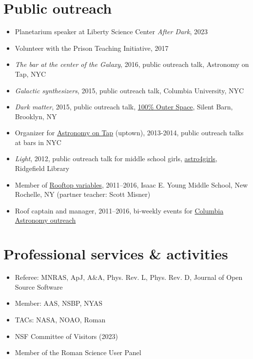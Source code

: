 \documentclass[12pt, letterpaper]{apw-cv}
\begin{document}
\section*{Public outreach}

\begin{itemize}
    \item Planetarium speaker at Liberty Science Center \emph{After Dark}, 2023
    \item Volunteer with the Prison Teaching Initiative, 2017
    \item \emph{The bar at the center of the Galaxy}, 2016, public outreach talk, Astronomy on Tap, NYC
    \item \emph{Galactic synthesizers}, 2015, public outreach talk, Columbia University, NYC
    \item \emph{Dark matter}, 2015, public outreach talk, \href{http://silentbarn.org/2015/03/100-outer-space-party}{100\% Outer Space}, Silent Barn, Brooklyn, NY
    \item Organizer for \href{http://astronomyontap.org/}{Astronomy on Tap} (uptown), 2013-2014, public outreach talks at bars in NYC
    \item \emph{Light}, 2012, public outreach talk for middle school girls, \href{http://www.newstimes.com/news/article/Astronomer-Shoot-for-the-stars-3380793.php}{astro4girls}, Ridgefield Library
    \item Member of \href{http://rv.astro.columbia.edu}{Rooftop variables}, 2011--2016, Isaac E. Young Middle School, New Rochelle, NY (partner teacher: Scott Misner)
    \item Roof captain and manager, 2011--2016, bi-weekly events for \href{http://outreach.astro.columbia.edu/}{Columbia Astronomy outreach}
\end{itemize}

\section*{Professional services \& activities}

\begin{itemize}
	\item Referee: MNRAS, ApJ, A\&A, Phys. Rev. L, Phys. Rev. D, Journal of Open Source Software
	\item Member: AAS, NSBP, NYAS
    \item TACs: NASA, NOAO, Roman
    \item NSF Committee of Visitors (2023)
    \item Member of the Roman Science User Panel
\end{itemize}
\end{document}
